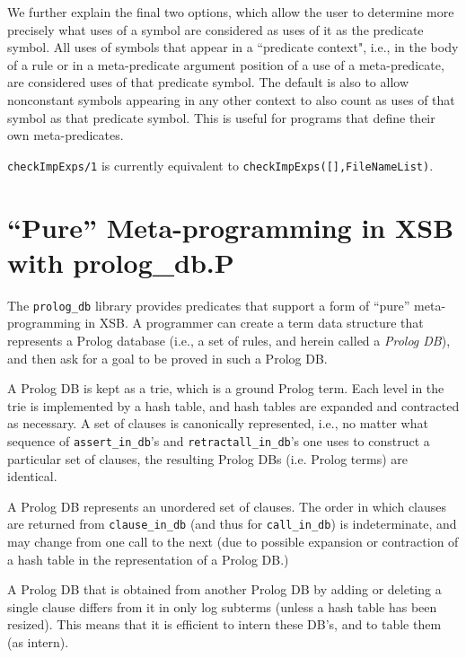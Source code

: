 \begin{description}
We further explain the final two options, which allow the user to
determine more precisely what uses of a symbol are considered as uses
of it as the predicate symbol.  All uses of symbols that appear in a
``predicate context", i.e., in the body of a rule or in a
meta-predicate argument position of a use of a meta-predicate, are
considered uses of that predicate symbol.  The default is also to
allow nonconstant symbols appearing in any other context to also count
as uses of that symbol as that predicate symbol.  This is useful for
programs that define their own meta-predicates.

%
{\tt checkImpExps/1}  is
currently equivalent to {\tt checkImpExps([],FileNameList)}.
\end{description}

\section{``Pure'' Meta-programming in XSB with prolog\_db.P}

The {\tt prolog\_db} library provides predicates that support a form of
``pure'' meta-programming in XSB.  A programmer can create a term data
structure that represents a Prolog database (i.e., a set of rules, and
herein called a {\em Prolog DB}), and then ask for a goal to be proved
in such a Prolog DB.  

A Prolog DB is kept as a trie, which is a ground Prolog term.  Each
level in the trie is implemented by a hash table, and hash tables are
expanded and contracted as necessary.  A set of clauses is canonically
represented, i.e., no matter what sequence of {\tt assert\_in\_db}'s
and {\tt retractall\_in\_db}'s one uses to construct a particular set
of clauses, the resulting Prolog DBs (i.e. Prolog terms) are identical.

A Prolog DB represents an unordered set of clauses.  The order in
which clauses are returned from {\tt clause\_in\_db} (and thus for
{\tt call\_in\_db}) is indeterminate, and may change from one call to
the next (due to possible expansion or contraction of a hash table in
the representation of a Prolog DB.)

A Prolog DB that is obtained from another Prolog DB by adding or
deleting a single clause differs from it in only log subterms (unless
a hash table has been resized).  This means that it is efficient to
intern these DB's, and to table them (as intern).

